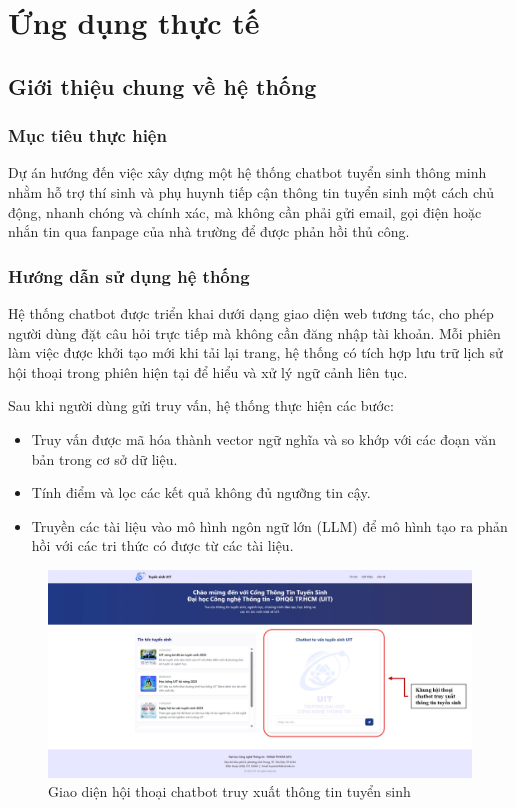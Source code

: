 \chapter{Ứng dụng thực tế}
\section{Giới thiệu chung về hệ thống}

\subsection{Mục tiêu thực hiện}

Dự án hướng đến việc xây dựng một hệ thống chatbot tuyển sinh thông minh nhằm hỗ trợ thí sinh và phụ huynh tiếp cận thông tin tuyển sinh một cách chủ động, nhanh chóng và chính xác, mà không cần phải gửi email, gọi điện hoặc nhắn tin qua fanpage của nhà trường để được phản hồi thủ công.

\subsection{Hướng dẫn sử dụng hệ thống}

Hệ thống chatbot được triển khai dưới dạng giao diện web tương tác, cho phép người dùng đặt câu hỏi trực tiếp mà không cần đăng nhập tài khoản. Mỗi phiên làm việc được khởi tạo mới khi tải lại trang, hệ thống có tích hợp lưu trữ lịch sử hội thoại trong phiên hiện tại để hiểu và xử lý ngữ cảnh liên tục.

Sau khi người dùng gửi truy vấn, hệ thống thực hiện các bước:
\begin{itemize}
    \item Truy vấn được mã hóa thành vector ngữ nghĩa và so khớp với các đoạn văn bản trong cơ sở dữ liệu.
    \item Tính điểm và lọc các kết quả không đủ ngưỡng tin cậy.
    \item Truyền các tài liệu vào mô hình ngôn ngữ lớn (LLM) để mô hình tạo ra phản hồi với các tri thức có được từ các tài liệu.
\end{itemize}

\begin{figure}[H]
    \caption{Giao diện hội thoại chatbot truy xuất thông tin tuyển sinh}
    \begin{center}
        \includegraphics[width=\linewidth]{assets/app_demo.png}
    \end{center}
\end{figure}

